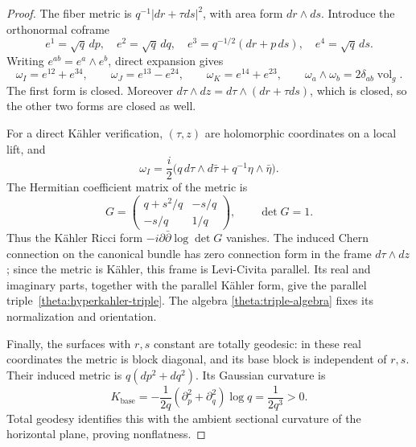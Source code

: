 \documentclass[11pt]{article}
\numberwithin{equation}{section}
\theoremstyle{definition}
\theoremstyle{remark}
\begin{document}
\begin{proof}
The fiber metric is $q^{-1}|dr+\tau ds|^2$, with area form
$dr\wedge ds$.  Introduce the orthonormal coframe
\[
 e^1=\sqrt q\,dp,\quad e^2=\sqrt q\,dq,\quad
 e^3=q^{-1/2}(dr+p\,ds),\quad e^4=\sqrt q\,ds.
\]
Writing $e^{ab}=e^a\wedge e^b$, direct expansion gives
\begin{equation}
 \omega_I=e^{12}+e^{34},\qquad
 \omega_J=e^{13}-e^{24},\qquad
 \omega_K=e^{14}+e^{23},\qquad
 \omega_a\wedge\omega_b=2\delta_{ab}\operatorname{vol}_g.
 \label{theta:triple-algebra}
\end{equation}
The first form is closed.  Moreover
$d\tau\wedge dz=d\tau\wedge(dr+\tau ds)$, which is closed,
so the other two forms are closed as well.

For a direct K\"ahler verification, $(\tau,z)$ are holomorphic coordinates
on a local lift, and
\[
 \omega_I=\frac i2\bigl(q\,d\tau\wedge d\bar\tau
                              +q^{-1}\eta\wedge\bar\eta\bigr).
\]
The Hermitian coefficient matrix of the metric is
\begin{equation}
 G=\begin{pmatrix}q+s^2/q&-s/q\\-s/q&1/q\end{pmatrix},
 \qquad \det G=1.
 \label{theta:Hermitian-determinant}
\end{equation}
Thus the K\"ahler Ricci form $-i\partial\bar\partial\log\det G$
vanishes.  The induced Chern connection on the canonical bundle has
zero connection form in the frame $d\tau\wedge dz$; since the metric is
K\"ahler, this frame is Levi-Civita parallel.  Its real and imaginary
parts, together with the parallel K\"ahler form, give the parallel
triple~\eqref{theta:hyperkahler-triple}.  The algebra
\eqref{theta:triple-algebra} fixes its normalization and orientation.

Finally, the surfaces with $r,s$ constant are totally geodesic: in these
real coordinates the metric is block diagonal, and its base block is
independent of $r,s$.  Their induced metric is $q(dp^2+dq^2)$.
Its Gaussian curvature is
\begin{equation}
 K_{\mathrm{base}}=-\frac1{2q}(\partial_p^2+\partial_q^2)\log q
                  =\frac1{2q^3}>0.
 \label{theta:nonflat-curvature}
\end{equation}
Total geodesy identifies this with the ambient sectional curvature of
the horizontal plane, proving nonflatness.
\end{proof}
\end{document}
